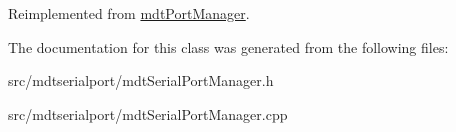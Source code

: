 Reimplemented from \hyperlink{classmdt_port_manager_aacbf87cc3d9c37c87e21696f8a6514bd}{mdtPortManager}.



The documentation for this class was generated from the following files:\begin{DoxyCompactItemize}
\item 
src/mdtserialport/mdtSerialPortManager.h\item 
src/mdtserialport/mdtSerialPortManager.cpp\end{DoxyCompactItemize}
